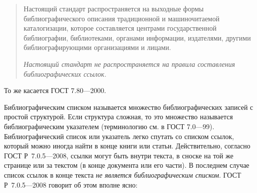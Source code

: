 \documentclass[10pt,a4paper,headings=small,numbers=enddot,english,russian]{ltxdockit}
\newcommand*{\gostcitename}[1][]{ГОСТ#1 Р~7.0.5---2008\xspace}
\newcommand*{\gostheadname}[1][]{ГОСТ#1 7.80---2000\xspace}
\begin{document}
\begin{quotation}
  Настоящий стандарт распространяется на выходные формы библиографического
  описания традиционной и машиночитаемой каталогизации, которое составляется
  центрами государственной библиографии, библиотеками, органами информации,
  издателями, другими библиографирующими организациями и лицами.

  \emph{Настоящий стандарт не распространяется на правила составления
    библиографических ссылок.}
\end{quotation}
То же касается \gostheadname.

Библиографическим списком называется множество библиографических записей с простой структурой.
Если структура сложная, то это множество называется библиографическим указателем
  (терминологию см. в ГОСТ 7.0---99).
Библиографический список или указатель легко спутать со списком ссылок, который можно
  иногда найти в конце книги или статьи.
Действительно, согласно \gostcitename, ссылки могут быть внутри текста, в сноске на той же странице 
  или за текстом (в конце документа или его части).
В последнем случае список ссылок в конце текста \emph{не является библиографическим списком}.
\gostcitename говорит об этом вполне ясно:
\end{document}
